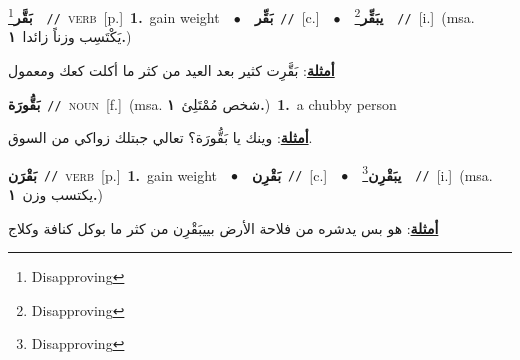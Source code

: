 \documentclass[10pt,a4paper,twoside]{article} %
\begin{document}
\begin{multicols}{2}
{\setlength\topsep{0pt}\textbf{\foreignlanguage{arabic}{بَقَّر}}\footnote{Disapproving}\ \ {\color{gray}\texttt{//}\color{black}}\ \textsc{verb}\ [p.]\ \textbf{1.}~gain weight\ \ $\bullet$\ \ \setlength\topsep{0pt}\textbf{\foreignlanguage{arabic}{بَقِّر}}\ {\color{gray}\texttt{//}\color{black}}\ [c.]\ \ $\bullet$\ \ \setlength\topsep{0pt}\textbf{\foreignlanguage{arabic}{يبَقِّر}}\footnote{Disapproving}\ \ {\color{gray}\texttt{//}\color{black}}\ [i.]\ \color{gray}(msa. \foreignlanguage{arabic}{يَكْتَسِب وزناً زائدا}~\foreignlanguage{arabic}{\textbf{١.}})\color{black}\  \begin{flushright}\color{gray}\foreignlanguage{arabic}{\textbf{\underline{\foreignlanguage{arabic}{أمثلة}}}: بَقَّرِت كثير بعد العيد من كثر ما أكلت كعك ومعمول}\end{flushright}\color{black}} \vspace{2mm}

{\setlength\topsep{0pt}\textbf{\foreignlanguage{arabic}{بَقُّورَة}}\ {\color{gray}\texttt{//}\color{black}}\ \textsc{noun}\ [f.]\ \color{gray}(msa. \foreignlanguage{arabic}{شخص مُمْتَلِئ}~\foreignlanguage{arabic}{\textbf{١.}})\color{black}\ \textbf{1.}~a chubby person\  \begin{flushright}\color{gray}\foreignlanguage{arabic}{\textbf{\underline{\foreignlanguage{arabic}{أمثلة}}}: وينك يا بَقُّورَة؟ تعالي جبتلك زواكي من السوق.}\end{flushright}\color{black}} \vspace{2mm}

{\setlength\topsep{0pt}\textbf{\foreignlanguage{arabic}{بَقْرَن}}\ {\color{gray}\texttt{//}\color{black}}\ \textsc{verb}\ [p.]\ \textbf{1.}~gain weight\ \ $\bullet$\ \ \setlength\topsep{0pt}\textbf{\foreignlanguage{arabic}{بَقْرِن}}\ {\color{gray}\texttt{//}\color{black}}\ [c.]\ \ $\bullet$\ \ \setlength\topsep{0pt}\textbf{\foreignlanguage{arabic}{يبَقْرِن}}\footnote{Disapproving}\ \ {\color{gray}\texttt{//}\color{black}}\ [i.]\ \color{gray}(msa. \foreignlanguage{arabic}{يكتسب وزن}~\foreignlanguage{arabic}{\textbf{١.}})\color{black}\  \begin{flushright}\color{gray}\foreignlanguage{arabic}{\textbf{\underline{\foreignlanguage{arabic}{أمثلة}}}: هو بس يدشره من فلاحة الأرض بييبَقْرِن من كثر ما بوكل كنافة وكلاج}\end{flushright}\color{black}} \vspace{2mm}


\end{multicols}
\end{document}
